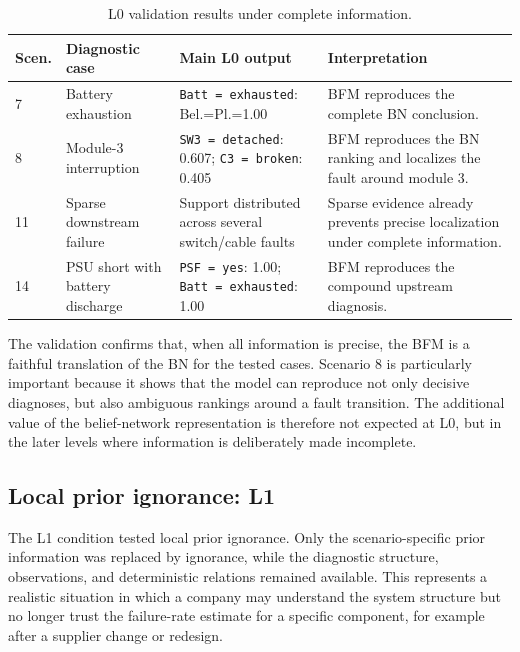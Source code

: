 \documentclass[runningheads]{llncs}
\begin{document}
\begin{table}[H]
\caption{L0 validation results under complete information.}\label{tab:l0_results}
\centering
\small
\begin{tabularx}{\textwidth}{p{0.9cm}p{2.7cm}p{4.0cm}X}
\toprule
Scen. & Diagnostic case & Main L0 output & Interpretation \\
\midrule
7 & Battery exhaustion & \texttt{Batt = exhausted}: Bel.=Pl.=1.00 & BFM reproduces the complete BN conclusion. \\
8 & Module-3 interruption & \texttt{SW3 = detached}: 0.607; \texttt{C3 = broken}: 0.405 & BFM reproduces the BN ranking and localizes the fault around module 3. \\
11 & Sparse downstream failure & Support distributed across several switch/cable faults & Sparse evidence already prevents precise localization under complete information. \\
14 & PSU short with battery discharge & \texttt{PSF = yes}: 1.00; \texttt{Batt = exhausted}: 1.00 & BFM reproduces the compound upstream diagnosis. \\
\bottomrule
\end{tabularx}
\end{table}

The validation confirms that, when all information is precise, the BFM is a faithful translation of the BN for the tested cases. Scenario 8 is particularly important because it shows that the model can reproduce not only decisive diagnoses, but also ambiguous rankings around a fault transition. The additional value of the belief-network representation is therefore not expected at L0, but in the later levels where information is deliberately made incomplete.

\subsection{Local prior ignorance: L1}
\label{sec:l1_local_prior_ignorance}

The L1 condition tested local prior ignorance. Only the scenario-specific prior information was replaced by ignorance, while the diagnostic structure, observations, and deterministic relations remained available. This represents a realistic situation in which a company may understand the system structure but no longer trust the failure-rate estimate for a specific component, for example after a supplier change or redesign.
\end{document}
